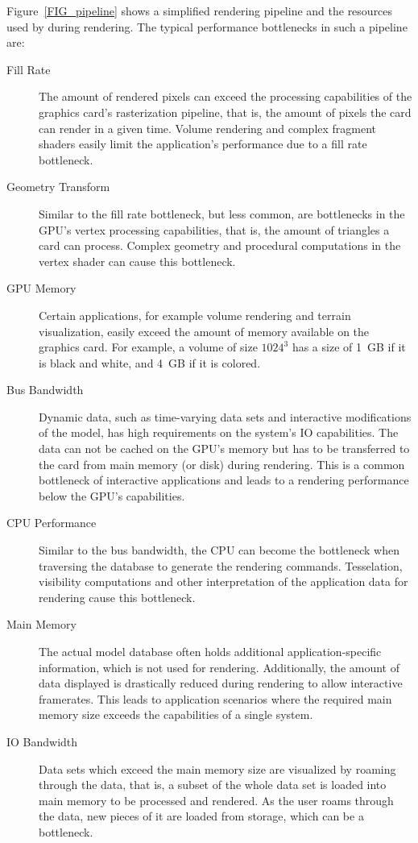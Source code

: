 \documentclass[10pt,a4paper]{scrartcl}
\begin{document}
Figure~\ref{FIG_pipeline} shows a simplified rendering pipeline and the
resources used by during rendering. The typical performance bottlenecks
in such a pipeline are:
\begin{description}
\item[Fill Rate] The amount of rendered pixels can exceed the processing
  capabilities of the graphics card's rasterization pipeline, that
  is, the amount of pixels the card can render in a given time. Volume
  rendering and complex fragment shaders easily limit the application's
  performance due to a fill rate bottleneck.
\item[Geometry Transform] Similar to the fill rate bottleneck, but
  less common, are bottlenecks in the GPU's vertex processing
  capabilities, that is, the amount of triangles a card can
  process. Complex geometry and procedural computations in the vertex
  shader can cause this bottleneck.
\item[GPU Memory] Certain applications, for example volume rendering and
  terrain visualization, easily exceed the amount of memory available on
  the graphics card. For example, a volume of size $1024^3$ has a size
  of 1~GB if it is black and white, and 4~GB if it is colored.
\item[Bus Bandwidth] Dynamic data, such as time-varying data sets and
  interactive modifications of the model, has high requirements on
  the system's IO capabilities. The data can not be cached on the GPU's
  memory but has to be transferred to the card from main memory (or
  disk) during rendering. This is a common bottleneck of interactive
  applications and leads to a rendering performance below the GPU's
  capabilities.
\item[CPU Performance] Similar to the bus bandwidth, the CPU can become
  the bottleneck when traversing the database to generate the rendering
  commands. Tesselation, visibility computations and other
  interpretation of the application data for rendering cause this bottleneck.
\item[Main Memory] The actual model database often holds additional
  application-specific information, which is not used for
  rendering. Additionally, the amount of data displayed is drastically reduced
  during rendering to allow interactive framerates. This leads to
  application scenarios where the required main memory size exceeds the
  capabilities of a single system.
\item[IO Bandwidth] Data sets which exceed the main memory size are
  visualized by roaming through the data, that is, a subset of the whole
  data set is loaded into main memory to be processed and rendered. As
  the user roams through the data, new pieces of it are loaded from
  storage, which can be a bottleneck.
\end{description}
\end{document}

